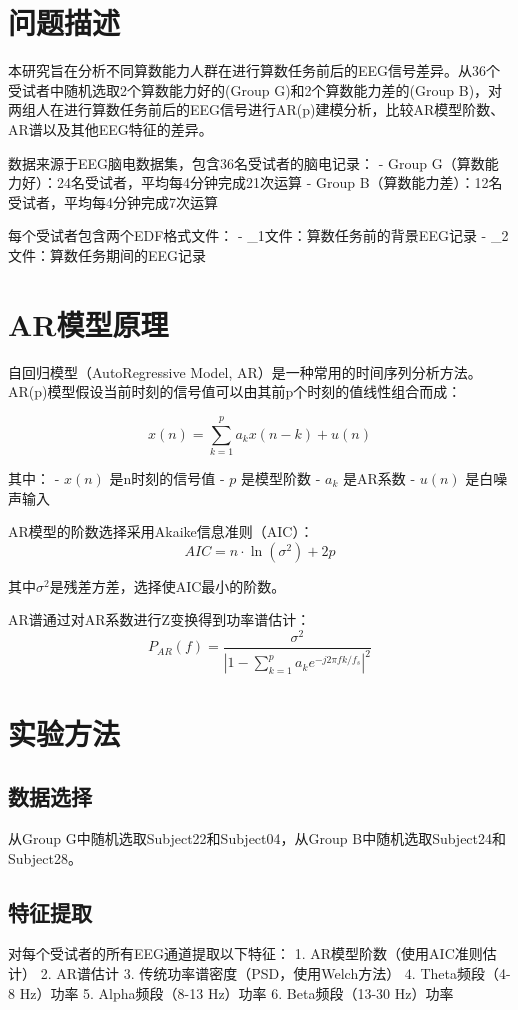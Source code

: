 \section{问题描述}

本研究旨在分析不同算数能力人群在进行算数任务前后的EEG信号差异。从36个受试者中随机选取2个算数能力好的(Group G)和2个算数能力差的(Group B)，对两组人在进行算数任务前后的EEG信号进行AR(p)建模分析，比较AR模型阶数、AR谱以及其他EEG特征的差异。

数据来源于EEG脑电数据集，包含36名受试者的脑电记录：
- Group G（算数能力好）：24名受试者，平均每4分钟完成21次运算
- Group B（算数能力差）：12名受试者，平均每4分钟完成7次运算

每个受试者包含两个EDF格式文件：
- \_1文件：算数任务前的背景EEG记录
- \_2文件：算数任务期间的EEG记录

\section{AR模型原理}

自回归模型（AutoRegressive Model, AR）是一种常用的时间序列分析方法。AR(p)模型假设当前时刻的信号值可以由其前p个时刻的值线性组合而成：

\[
x(n) = \sum_{k=1}^{p} a_k x(n-k) + u(n)
\]

其中：
- \( x(n) \) 是n时刻的信号值
- \( p \) 是模型阶数
- \( a_k \) 是AR系数
- \( u(n) \) 是白噪声输入

AR模型的阶数选择采用Akaike信息准则（AIC）：
\[
AIC = n \cdot \ln(\sigma^2) + 2p
\]

其中\( \sigma^2 \)是残差方差，选择使AIC最小的阶数。

AR谱通过对AR系数进行Z变换得到功率谱估计：
\[
P_{AR}(f) = \frac{\sigma^2}{\left|1 - \sum_{k=1}^{p} a_k e^{-j2\pi f k / f_s}\right|^2}
\]

\section{实验方法}

\subsection{数据选择}
从Group G中随机选取Subject22和Subject04，从Group B中随机选取Subject24和Subject28。

\subsection{特征提取}
对每个受试者的所有EEG通道提取以下特征：
1. AR模型阶数（使用AIC准则估计）
2. AR谱估计
3. 传统功率谱密度（PSD，使用Welch方法）
4. Theta频段（4-8 Hz）功率
5. Alpha频段（8-13 Hz）功率
6. Beta频段（13-30 Hz）功率

